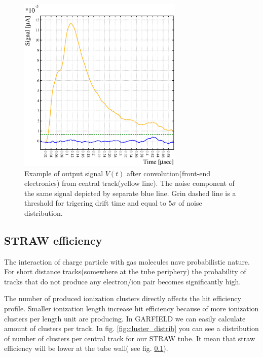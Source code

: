\documentclass[]{article}
\begin{document}
	\begin{figure}[h]
	\centering
	\includegraphics[width=0.7\textwidth]{signal_noise_threshold.eps}
	\caption{ Example of output signal $V(t)$ after convolution(front-end electronics) from central track(yellow line). The noise component of the same signal depicted by separate blue line. Grin dashed line is a threshold for trigering drift time and equal to $5\sigma$ of noise distribution.}
	\label{fig:signal_example}
	\end{figure}
	
	\subsection{ STRAW efficiency}
	
	The interaction of charge particle with gas molecules nave probabilistic nature. For short distance tracks(somewhere at the tube periphery) the probability of tracks that do not produce any electron/ion pair becomes significantly high.
		
	The number of produced ionization clusters directly affects the hit efficiency profile. \cite{kozlinskiy} Smaller ionization length increase hit efficiency because of more ionization clusters per length unit are producing. In GARFIELD we can easily calculate amount of clusters per track. In fig. \ref{fig:cluster_distrib} you can see a distribution of number of clusters per central track for our STRAW tube. It mean that straw efficiency will be lower at the tube wall( see fig. \ref{}).
		
\end{document}

